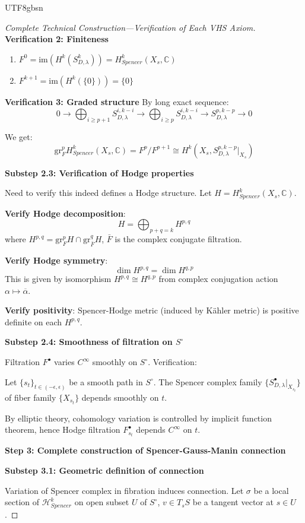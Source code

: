 \documentclass[a4paper,12pt]{extarticle}
\theoremstyle{definition}
\begin{document}
\begin{CJK}{UTF8}{gbsn}
\begin{proof}[Complete Technical Construction—Verification of Each VHS Axiom]
\textbf{Verification 2: Finiteness}
\begin{enumerate}
    \item $F^0 = \text{im}(H^k(S^k_{D,\lambda})) = H^k_{Spencer}(X_s, \mathbb{C})$
    \item $F^{k+1} = \text{im}(H^k(\{0\})) = \{0\}$
\end{enumerate}

\textbf{Verification 3: Graded structure}
By long exact sequence:
$$0 \to \bigoplus_{i \geq p+1} S^{i,k-i}_{D,\lambda} \to \bigoplus_{i \geq p} S^{i,k-i}_{D,\lambda} \to S^{p,k-p}_{D,\lambda} \to 0$$

We get:
$$\text{gr}^p_F H^k_{Spencer}(X_s, \mathbb{C}) = F^p/F^{p+1} \cong H^k(X_s, S^{p,k-p}_{D,\lambda}|_{X_s})$$

\textbf{Substep 2.3: Verification of Hodge properties}

Need to verify this indeed defines a Hodge structure. Let $H = H^k_{Spencer}(X_s, \mathbb{C})$.

\textbf{Verify Hodge decomposition}:
$$H = \bigoplus_{p+q=k} H^{p,q}$$
where $H^{p,q} = \text{gr}^p_F H \cap \text{gr}^q_{\bar{F}} H$, $\bar{F}$ is the complex conjugate filtration.

\textbf{Verify Hodge symmetry}:
$$\dim H^{p,q} = \dim H^{q,p}$$
This is given by isomorphism $H^{p,q} \cong H^{q,p}$ from complex conjugation action $\alpha \mapsto \overline{\alpha}$.

\textbf{Verify positivity}: Spencer-Hodge metric (induced by Kähler metric) is positive definite on each $H^{p,q}$.

\textbf{Substep 2.4: Smoothness of filtration on $S^\circ$}

Filtration $F^{\bullet}$ varies $C^\infty$ smoothly on $S^\circ$. Verification:

Let $\{s_t\}_{t \in (-\epsilon, \epsilon)}$ be a smooth path in $S^\circ$. The Spencer complex family $\{S^{\bullet}_{D,\lambda}|_{X_{s_t}}\}$ of fiber family $\{X_{s_t}\}$ depends smoothly on $t$.

By elliptic theory, cohomology variation is controlled by implicit function theorem, hence Hodge filtration $F^{\bullet}_{s_t}$ depends $C^\infty$ on $t$.

\textbf{Step 3: Complete construction of Spencer-Gauss-Manin connection}

\textbf{Substep 3.1: Geometric definition of connection}

Variation of Spencer complex in fibration induces connection. Let $\sigma$ be a local section of $\mathcal{H}^k_{Spencer}$ on open subset $U$ of $S^\circ$, $v \in T_sS$ be a tangent vector at $s \in U$.


\end{proof}
\end{CJK}
\end{document}

